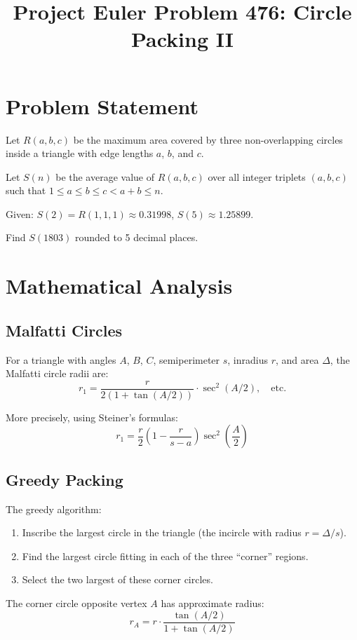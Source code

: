 \documentclass[12pt]{article}
\title{Project Euler Problem 476: Circle Packing II}
\author{}
\date{}
\begin{document}
\maketitle

\section{Problem Statement}
Let $R(a, b, c)$ be the maximum area covered by three non-overlapping circles inside a triangle with edge lengths $a$, $b$, and $c$.

Let $S(n)$ be the average value of $R(a, b, c)$ over all integer triplets $(a, b, c)$ such that $1 \le a \le b \le c < a + b \le n$.

Given: $S(2) = R(1,1,1) \approx 0.31998$, $S(5) \approx 1.25899$.

Find $S(1803)$ rounded to 5 decimal places.

\section{Mathematical Analysis}

\subsection{Malfatti Circles}
For a triangle with angles $A$, $B$, $C$, semiperimeter $s$, inradius $r$, and area $\Delta$, the Malfatti circle radii are:
\[
r_1 = \frac{r}{2(1 + \tan(A/2))} \cdot \sec^2(A/2), \quad \text{etc.}
\]

More precisely, using Steiner's formulas:
\[
r_1 = \frac{r}{2} \left(1 - \frac{r}{s - a}\right) \sec^2\!\left(\frac{A}{2}\right)
\]

\subsection{Greedy Packing}
The greedy algorithm:
\begin{enumerate}
    \item Inscribe the largest circle in the triangle (the incircle with radius $r = \Delta/s$).
    \item Find the largest circle fitting in each of the three ``corner'' regions.
    \item Select the two largest of these corner circles.
\end{enumerate}

The corner circle opposite vertex $A$ has approximate radius:
\[
r_A = r \cdot \frac{\tan(A/2)}{1 + \tan(A/2)}
\]
\end{document}
